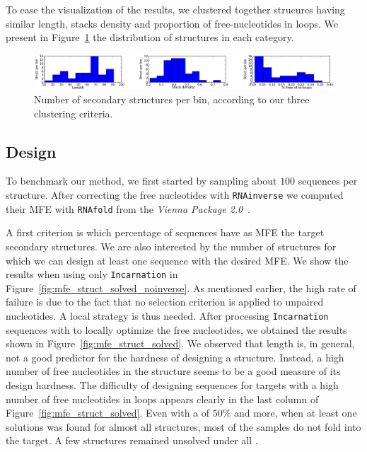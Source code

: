 To ease the visualization of the results, we clustered together strucures
 having similar length, stacks density and proportion of free-nucleotides in loops. 
  We present in Figure~\ref{fig:bins} the distribution of structures in each category.
 
 \begin{figure}[ht!]
 	\centering
	\includegraphics[width=\textwidth]{Figures/bins_distribution.png}
	\caption{Number of secondary structures per bin, according to our three clustering criteria.}
	\label{fig:bins}
 \end{figure}
 
 
\subsection{Design}
 To benchmark our method, we first started by sampling about $100$ sequences per structure. After correcting the free nucleotides with
 \texttt{RNAinverse} we computed their MFE with \texttt{RNAfold} from the \textit{Vienna Package 2.0}~\cite{Hofacker:1994}.
 
A first criterion is which percentage of sequences have as MFE the target
secondary structures. We are also interested by the number of structures
for which we can design at least one sequence with the desired MFE.
We show the results when using only \texttt{Incarnation} in 
 Figure~\ref{fig:mfe_struct_solved_noinverse}. As mentioned earlier, the high rate of failure
is due to the fact that no selection criterion is applied to
unpaired nucleotides. A local strategy is thus needed.
After processing \texttt{Incarnation} sequences with \RNAinverse to 
locally optimize the free nucleotides, we obtained the results 
shown in Figure~\ref{fig:mfe_struct_solved}. We observed
that length is, in general, not a good predictor for the hardness of designing a structure. 
Instead, a high number of free nucleotides in the structure seems to be a 
good measure of its design hardness. 
 The difficulty of 
designing sequences for targets with a high number of free nucleotides 
 in loops appears clearly in the last column of Figure~\ref{fig:mfe_struct_solved}.
Even with a \GCContent of $50\%$ and more, when at least
one solutions was found for almost all structures, most of the samples 
do not fold into the target. A few structures remained unsolved under
all \GCContent.


